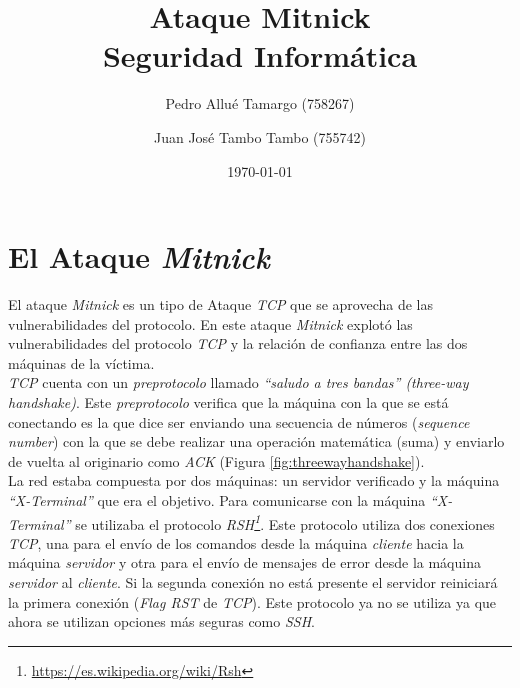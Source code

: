 \documentclass{article}
\begin{document}
\begin{titlepage}
\title{\textbf{
    {\Huge Ataque Mitnick}\\
    {\Large Seguridad Informática}
}}
\author{
    Pedro Allué Tamargo (758267)
    \and
    Juan José Tambo Tambo (755742)
}
\date{\today}
\clearpage\maketitle
\thispagestyle{empty}
\tableofcontents
\end{titlepage}

\section{El Ataque \textit{Mitnick}}

El ataque \textit{Mitnick} es un tipo de Ataque \textit{TCP} que se aprovecha de las vulnerabilidades del protocolo. En este ataque \textit{Mitnick} explotó las vulnerabilidades del protocolo \textit{TCP} y la relación de confianza entre las dos máquinas de la víctima.\\
\textit{TCP} cuenta con un \textit{preprotocolo} llamado \textit{``saludo a tres bandas'' (three-way handshake)}. Este \textit{preprotocolo} verifica que la máquina con la que se está conectando es la que dice ser enviando una secuencia de números (\textit{sequence number}) con la que se debe realizar una operación matemática (suma) y enviarlo de vuelta al originario como \textit{ACK} (Figura \ref{fig:threewayhandshake}).\\
La red estaba compuesta por dos máquinas: un servidor verificado y la máquina \textit{``X-Terminal''} que era el objetivo. Para comunicarse con la máquina \textit{``X-Terminal''} se utilizaba el protocolo \textit{RSH\footnote{\url{https://es.wikipedia.org/wiki/Rsh}}}. Este protocolo utiliza dos conexiones \textit{TCP}, una para el envío de los comandos desde la máquina \textit{cliente} hacia la máquina \textit{servidor} y otra para el envío de mensajes de error desde la máquina \textit{servidor} al \textit{cliente}. Si la segunda conexión no está presente el servidor reiniciará la primera conexión (\textit{Flag RST} de \textit{TCP}). Este protocolo ya no se utiliza ya que ahora se utilizan opciones más seguras como \textit{SSH}.\\
\end{document}
